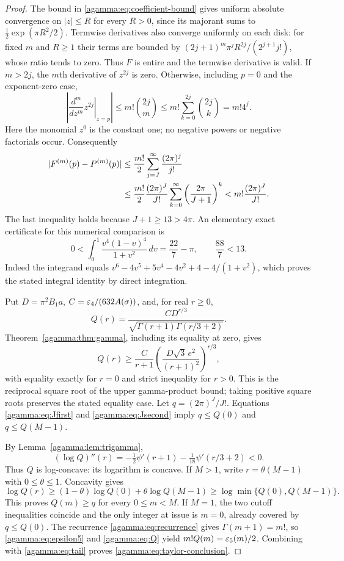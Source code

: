 \documentclass[11pt]{article}
\begin{document}
\begin{proof}
The bound in \eqref{agamma:eq:coefficient-bound} gives uniform absolute
convergence on $|z|\le R$ for every $R>0$, since its majorant sums
to $\tfrac12\exp(\pi R^2/2)$. Termwise derivatives also converge
uniformly on each disk: for fixed $m$ and $R\ge1$ their terms are
bounded by $(2j+1)^m\pi^j R^{2j}/(2^{j+1}j!)$, whose ratio tends
to zero. Thus $F$ is entire and the termwise derivative is valid.
If $m>2j$, the $m$th derivative of $z^{2j}$ is zero. Otherwise,
including $p=0$ and the exponent-zero case,
\[
\left|\left.\frac{d^m}{dz^m}z^{2j}\right|_{z=p}\right|
\le m!\binom{2j}{m}\le m!\sum_{k=0}^{2j}\binom{2j}{k}
=m!4^j.
\]
Here the monomial $z^0$ is the constant one; no negative powers
or negative factorials occur. Consequently
\begin{align}
|F^{(m)}(p)-P^{(m)}(p)|
&\le\frac{m!}{2}\sum_{j=J}^\infty\frac{(2\pi)^j}{j!}\notag\\
&\le\frac{m!}{2}\frac{(2\pi)^J}{J!}
\sum_{k=0}^\infty\left(\frac{2\pi}{J+1}\right)^k
<m!\frac{(2\pi)^J}{J!}.\label{agamma:eq:tail}
\end{align}
The last inequality holds because $J+1\ge13>4\pi$.
An elementary exact certificate for this numerical comparison is
\[
0<\int_0^1\frac{v^4(1-v)^4}{1+v^2}\,dv
=\frac{22}{7}-\pi,\qquad \frac{88}{7}<13.
\]
Indeed the integrand equals
$v^6-4v^5+5v^4-4v^2+4-4/(1+v^2)$, which proves the stated
integral identity by direct integration.

Put $D=\pi^2B_1a$, $C=\varepsilon_4/(632A(\sigma))$, and, for real $r\ge0$,
\begin{equation}\label{agamma:eq:Q}
Q(r)=\frac{CD^{r/3}}{\sqrt{\Gamma(r+1)\Gamma(r/3+2)}}.
\end{equation}
Theorem~\ref{agamma:thm:gamma}, including its equality at zero, gives
\begin{equation}\label{agamma:eq:Qlower}
Q(r)\ge\frac{C}{r+1}
\left(\frac{D\sqrt3\,e^2}{(r+1)^2}\right)^{r/3},
\end{equation}
with equality exactly for $r=0$ and strict inequality for $r>0$.
This is the reciprocal square root of the upper gamma-product
bound; taking positive square roots preserves the stated equality
case. Let $q=(2\pi)^J/J!$. Equations \eqref{agamma:eq:Jfirst} and
\eqref{agamma:eq:Jsecond} imply $q\le Q(0)$ and $q\le Q(M-1)$.

By Lemma~\ref{agamma:lem:trigamma},
\begin{equation}\label{agamma:eq:Qconcavity}
(\log Q)''(r)=-\tfrac12\psi'(r+1)
-\tfrac1{18}\psi'(r/3+2)<0.
\end{equation}
Thus $Q$ is log-concave: its logarithm is concave. If $M>1$,
write $r=\theta(M-1)$ with $0\le\theta\le1$. Concavity gives
\[
\log Q(r)\ge(1-\theta)\log Q(0)+\theta\log Q(M-1)
\ge\log\min\{Q(0),Q(M-1)\}.
\]
This proves $Q(m)\ge q$ for every $0\le m<M$.
If $M=1$, the two cutoff inequalities coincide and the only
integer at issue is $m=0$, already covered by $q\le Q(0)$.
The recurrence \eqref{agamma:eq:recurrence} gives $\Gamma(m+1)=m!$,
so \eqref{agamma:eq:epsilon5} and \eqref{agamma:eq:Q} yield
$m!Q(m)=\varepsilon_5(m)/2$. Combining with \eqref{agamma:eq:tail} proves
\eqref{agamma:eq:taylor-conclusion}.


\end{proof}
\end{document}
